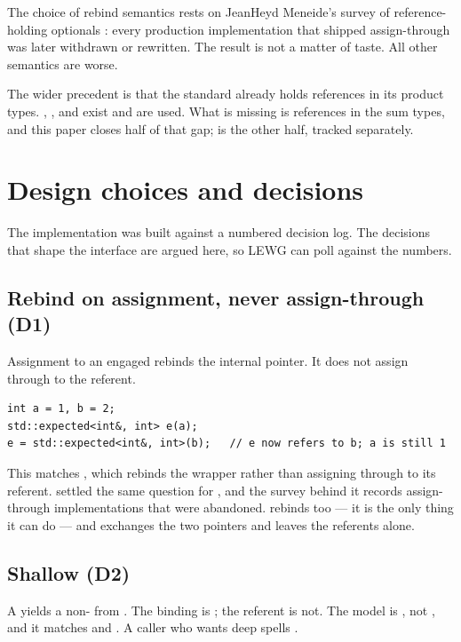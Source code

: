 \documentclass[a4paper,10pt,oneside,openany,final,article]{memoir}
\begin{document}
The choice of rebind semantics rests on JeanHeyd Meneide's survey of
reference-holding optionals \cite{P1683R0, REFBIND}: every production
implementation that shipped assign-through was later withdrawn or rewritten.
The result is not a matter of taste. All other semantics are worse.

The wider precedent is that the standard already holds references in its
product types. , , and
 exist and are used. What is missing is references
in the sum types, and this paper closes half of that gap; 
is the other half, tracked separately.

\chapter{Design choices and decisions}

The implementation was built against a numbered decision log. The decisions
that shape the interface are argued here, so LEWG can poll against the numbers.

\section{Rebind on assignment, never assign-through (D1)}

Assignment to an engaged  rebinds the internal pointer.
It does not assign through to the referent.

\begin{verbatim}
int a = 1, b = 2;
std::expected<int&, int> e(a);
e = std::expected<int&, int>(b);   // e now refers to b; a is still 1
\end{verbatim}

This matches , which rebinds the
wrapper rather than assigning through to its referent. \cite{P2988R12} settled
the same question for , and the survey behind it
\cite{P1683R0} records assign-through implementations that were abandoned.
 rebinds too --- it is the only thing it can do --- and
 exchanges the two pointers and leaves the referents alone.

\section{Shallow  (D2)}

A  yields a non-  from
. The binding is ; the referent is not. The model
is , not , and it matches
 and . A caller who wants deep
 spells .
\end{document}
